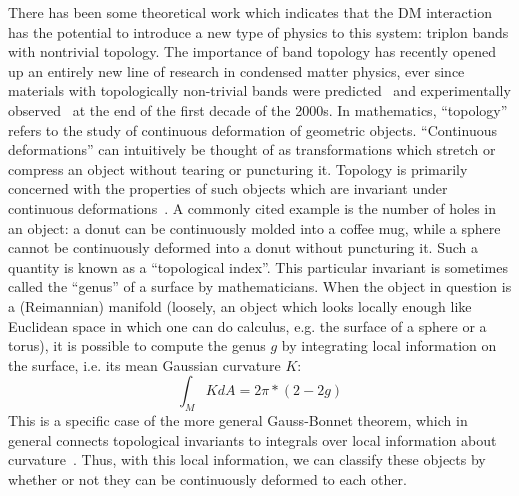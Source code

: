 \documentclass{thesis-umich}
\begin{document}
There has been some theoretical work which indicates that the DM interaction has the potential to introduce a new type of physics to this system: triplon bands with nontrivial topology. The importance of band topology has recently opened up an entirely new line of research in condensed matter physics, ever since materials with topologically non-trivial bands were predicted~\cite{Fu2007} and experimentally observed~\cite{Hsieh2008} at the end of the first decade of the 2000s. In mathematics, ``topology'' refers to the study of continuous deformation of geometric objects. ``Continuous deformations'' can intuitively be thought of as transformations which stretch or compress an object without tearing or puncturing it. Topology is primarily concerned with the properties of such objects which are invariant under continuous deformations~\cite{Munkres}. A commonly cited example is the number of holes in an object: a donut can be continuously molded into a coffee mug, while a sphere cannot be continuously deformed into a donut without puncturing it. Such a quantity is known as a ``topological index''. This particular invariant is sometimes called the ``genus'' of a surface by mathematicians. When the object in question is a (Reimannian) manifold (loosely, an object which looks locally enough like Euclidean space in which one can do calculus, e.g. the surface of a sphere or a torus), it is possible to compute the genus $g$ by integrating local information on the surface, i.e. its mean Gaussian curvature $K$:
\[ \int_M K dA = 2\pi * (2 - 2 g) \]
This is a specific case of the more general Gauss-Bonnet theorem, which in general connects topological invariants to integrals over local information about curvature~\cite{Lee}. Thus, with this local information, we can classify these objects by whether or not they can be continuously deformed to each other.
\end{document}
